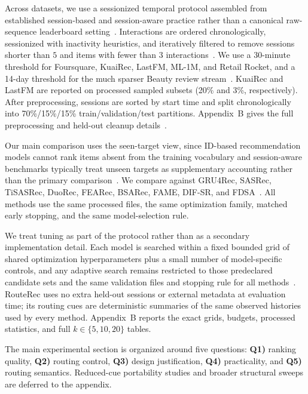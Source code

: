 \documentclass[sigconf,review,anonymous]{acmart}
\begin{document}
Across datasets, we use a sessionized temporal protocol assembled from established session-based and session-aware practice rather than a canonical raw-sequence leaderboard setting~\cite{jannach2022sessions,quadrana2017hrnn,latifi2021sessionaware}. Interactions are ordered chronologically, sessionized with inactivity heuristics, and iteratively filtered to remove sessions shorter than $5$ and items with fewer than $3$ interactions~\cite{li2017narm,wu2019srgnn}. We use a 30-minute threshold for Foursquare, KuaiRec, LastFM, ML-1M, and Retail Rocket, and a 14-day threshold for the much sparser Beauty review stream~\cite{quadrana2017hrnn,lacic2020jobsessions,borgbruun2022insurance}. KuaiRec and LastFM are reported on processed sampled subsets (20\% and 3\%, respectively). After preprocessing, sessions are sorted by start time and split chronologically into 70\%/15\%/15\% train/validation/test partitions. Appendix~B gives the full preprocessing and held-out cleanup details~\cite{ji2023leakage,gusak2025timesplit}.

Our main comparison uses the seen-target view, since ID-based recommendation models cannot rank items absent from the training vocabulary and session-aware benchmarks typically treat unseen targets as supplementary accounting rather than the primary comparison~\cite{latifi2021sessionaware,li2017narm,wu2019srgnn}. We compare against GRU4Rec, SASRec, TiSASRec, DuoRec, FEARec, BSARec, FAME, DIF-SR, and FDSA~\cite{hidasi2016gru4rec,kang2018sasrec,li2020tisasrec,qiu2022duorec,du2023fearec,shin2024bsarec,liu2025fame,xie2022difsr,zhang2019fdsa}. All methods use the same processed files, the same optimization family, matched early stopping, and the same model-selection rule.

We treat tuning as part of the protocol rather than as a secondary implementation detail. Each model is searched within a fixed bounded grid of shared optimization hyperparameters plus a small number of model-specific controls, and any adaptive search remains restricted to those predeclared candidate sets and the same validation files and stopping rule for all methods~\cite{galuzzi2020bayesopt}. RouteRec uses no extra held-out sessions or external metadata at evaluation time; its routing cues are deterministic summaries of the same observed histories used by every method. Appendix~B reports the exact grids, budgets, processed statistics, and full $k\in\{5,10,20\}$ tables.

The main experimental section is organized around five questions: \textbf{Q1)} ranking quality, \textbf{Q2)} routing control, \textbf{Q3)} design justification, \textbf{Q4)} practicality, and \textbf{Q5)} routing semantics. Reduced-cue portability studies and broader structural sweeps are deferred to the appendix.
\end{document}
